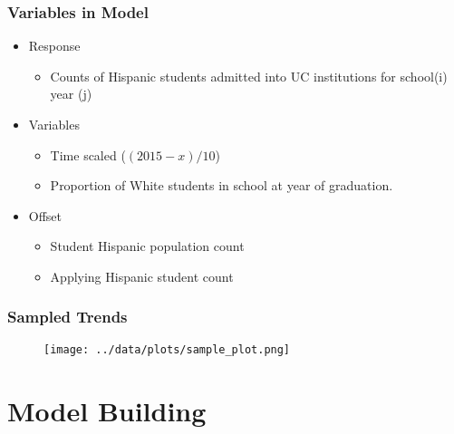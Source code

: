 \documentclass{beamer}
\begin{document}

\begin{frame}
\frametitle{Variables in Model}

\begin{itemize}
  \item Response
  \begin{itemize}
    \item Counts of Hispanic students admitted into UC institutions for school(i) year (j)
  \end{itemize}
  \item Variables
    \begin{itemize}
      \item Time scaled ($(2015 - x) / 10$)
      \item Proportion of White students in school at year of graduation.
    \end{itemize}
  \item Offset
  \begin{itemize}
    \item Student Hispanic population count
    \item Applying Hispanic student count
  \end{itemize}
\end{itemize}

\end{frame}


\begin{frame}
\frametitle{Sampled Trends}
\begin{figure}
\texttt{[image: ../data/plots/sample\_plot.png]}
\end{figure}
\end{frame}

\section{Model Building}
\end{document}
